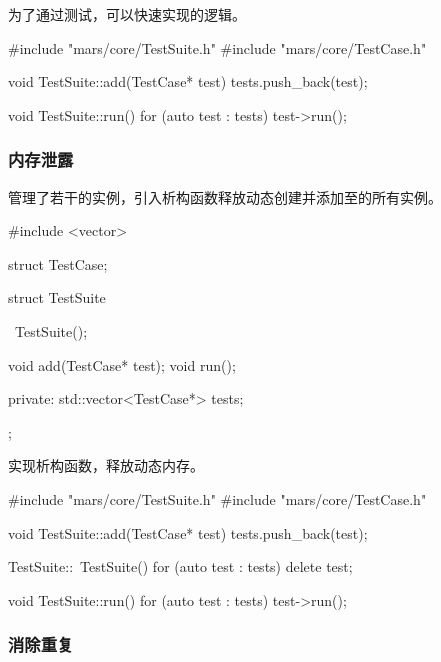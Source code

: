 \begin{content}
为了通过测试，可以快速实现的逻辑。

\begin{leftbar}
 \begin{c++}[caption={\ttfamily{src/mars/core/TestSuite.cc}}]
#include "mars/core/TestSuite.h"
#include "mars/core/TestCase.h"

void TestSuite::add(TestCase* test) {
  tests.push_back(test);
}

void TestSuite::run() {
  for (auto test : tests) {
    test->run();
  }
}
 \end{c++}
\end{leftbar}

\subsubsection{内存泄露}

管理了若干的实例，引入析构函数释放动态创建并添加至的所有实例。

\begin{leftbar}
 \begin{c++}[caption={\ttfamily{include/mars/core/TestSuite.h}}]
#include <vector>

struct TestCase;

struct TestSuite {
  ~TestSuite();

  void add(TestCase* test);
  void run();

private:
  std::vector<TestCase*> tests;
};
 \end{c++}
\end{leftbar}

实现析构函数，释放动态内存。

\begin{leftbar}
 \begin{c++}[caption={\ttfamily{src/mars/core/TestSuite.cc}}]
#include "mars/core/TestSuite.h"
#include "mars/core/TestCase.h"

void TestSuite::add(TestCase* test) {
  tests.push_back(test);
}

TestSuite::~TestSuite() {
  for (auto test : tests) {
    delete test;
  }
}

void TestSuite::run() {
  for (auto test : tests) {
    test->run();
  }
}
 \end{c++}
\end{leftbar}

\subsubsection{消除重复}


\end{content}
